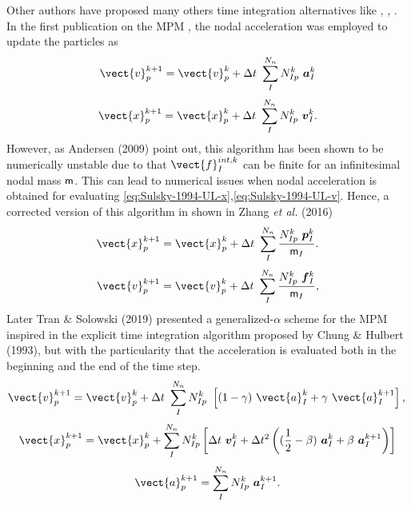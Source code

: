 Other authors have proposed many others time integration alternatives
like \cite{Guilkey2003}, \cite{Tran2019e}, \cite{Charlton2017}. In the
first publication on the MPM \cite{Sulsky1994}, the nodal acceleration
was employed to update the particles as
\begin{equation}
  \label{eq:Sulsky-1994-UL-v}
  \vect{v}_p^{k+1} = \vect{v}_p^{k} + \Delta t\
  \sum^{N_n}_{I}N_{Ip}^{k}\ \vec{a}_{I}^{k}
\end{equation}
\begin{equation}
  \label{eq:Sulsky-1994-UL-x}
  \vect{x}_p^{k+1} = \vect{x}_p^{k} + \Delta t\ \sum^{N_n}_{I}N_{Ip}^{k}\ \vec{v}_{I}^{k}.
\end{equation}
However, as Andersen (2009)\cite{thesis_Andersen_2009} point out, this algorithm has been shown to be numerically unstable due to that
$\vect{f}_I^{int,k}$ can be finite for an infinitesimal nodal mass
$\mathsf{m}$. This can lead to numerical issues when nodal acceleration
is obtained for evaluating \eqref{eq:Sulsky-1994-UL-x},\eqref{eq:Sulsky-1994-UL-v}. Hence, a
corrected version of this algorithm in shown in Zhang {\it et al.}
(2016)\cite{Zhang_book_2016}
\begin{equation}
  \label{eq:Zhang-2016-UL-x}
  \vect{x}_p^{k+1} = \vect{x}_p^{k} + \Delta t\ \sum^{N_n}_{I} \frac{N_{Ip}^{k}\ \vec{p}_{I}^{k}}{\tens{m}_I}.  
\end{equation}
\begin{equation}
  \label{eq:Zhang-2016-UL-v}
  \vect{v}_p^{k+1} = \vect{v}_p^{k} + \Delta t\
  \sum^{N_n}_{I}\frac{N_{Ip}^{k}\ \vec{f}_{I}^{k}}{\tens{m}_I},
\end{equation}
Later Tran \& Solowski (2019)\cite{Tran2019e} presented a
generalized-$\alpha$ scheme for the MPM inspired in the explicit time
integration algorithm proposed by Chung \& Hulbert
(1993)\cite{Geranlized_alpha_1993}, but with the particularity that
the acceleration is evaluated both in the beginning and the end of the
time step.
\begin{equation}
  \label{eq:Tran-2019-GA-v}
  \vect{v}_p^{k+1} = \vect{v}_p^{k} + \Delta t\
  \sum^{N_n}_{I} N_{Ip}^{k}\ \left[(1 - \gamma)\ \vect{a}_I^{k} +
    \gamma\ \vect{a}_I^{k+1} \right],\\
\end{equation}
\begin{equation}
\label{eq:Tran-2019-GA-x}
  \vect{x}_p^{k+1} = \vect{x}_p^{k} + 
  \sum^{N_n}_{I}N_{Ip}^{k} \left[ \Delta t\ \vec{v}_{I}^{k}+ \Delta t^2\left( (\frac{1}{2} - \beta)\
    \vec{a}_{I}^{k} + \beta\ \vec{a}_{I}^{k+1} \right) \right]
\end{equation}
\begin{equation}
  \label{eq:Tran-2019-GA-a}
  \vect{a}_p^{k+1} = \sum^{N_n}_{I}N_{Ip}^{k}\ \vec{a}_{I}^{k+1}.
\end{equation}

